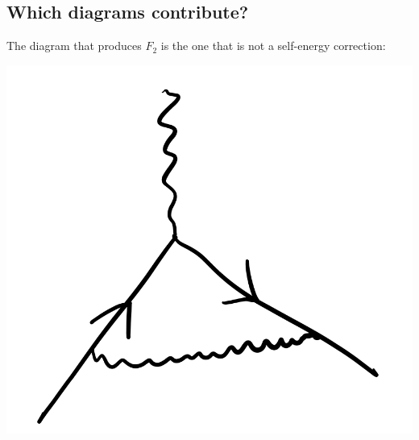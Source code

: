 \subsection{Which diagrams contribute?}
The diagram that produces $F_2$ is the one that is not a self-energy correction:
\begin{center}
    \includegraphics[scale=0.35]{Lectures/Images/lec10-relevantdiagram.png}
\end{center}

